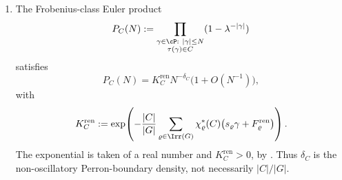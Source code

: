 \begin{theorem}
\begin{enumerate}[label=\textup{(\roman*)},leftmargin=*]
\begin{equation}
    F_\varrho^{\mathrm{ren}}
    =
    \sum_{r,m\ge1}\frac{\mu(m)}{rm}
      \sum_{\pi\in\Irr(G)}
        a_{\varrho,\pi}^{(m)}
        B_{rm,\pi}^{\mathrm{ren}},
  \end{equation}
  where \(k=1\) terms are the reduced Perron-boundary finite parts computed
  from the factorisation and Abel branch rule, and \(k\ge2\) terms are ordinary
  interior determinant logarithms, as in
  \eqref{eq:renormalized-fixed-label-determinant}.  Thus the determinant finite
  parts \(B_{k,\pi}^{\mathrm{ren}}=\mathcal B_{k,\pi}^{\mathrm{ren}}\), and
  hence the output \(F_\varrho^{\mathrm{ren}}\), are derived from the finite
  datum \(D_{\partial}^{\mathrm{ren}}\), not supplied as extra inputs and not
  determined by raw determinant polynomials without the branch rule.
  \item The Frobenius-class Euler product
  \[
    P_C(N):=
    \prod_{\substack{\gamma\in\cP:\ |\gamma|\le N\\
      \tau(\gamma)\in C}}
      (1-\lambda^{-|\gamma|})
  \]
  satisfies
  \begin{equation}\label{eq:renormalized-frobenius-product}
    P_C(N)=K_C^{\mathrm{ren}}N^{-\delta_C}\bigl(1+O(N^{-1})\bigr),
  \end{equation}
  with
  \begin{equation}\label{eq:renormalized-frobenius-product-constant}
    K_C^{\mathrm{ren}}
    :=
    \exp\!\left(
      -\frac{|C|}{|G|}
        \sum_{\varrho\in\Irr(G)}
          \chi_\varrho^\ast(C)
          \bigl(s_\varrho\gamma+F_\varrho^{\mathrm{ren}}\bigr)
    \right).
  \end{equation}
  The exponential is taken of a real number and
  \(K_C^{\mathrm{ren}}>0\), by
  .
  Thus \(\delta_C\) is the non-oscillatory Perron-boundary density, not
  necessarily \(|C|/|G|\).
  \end{enumerate}
\end{theorem}


